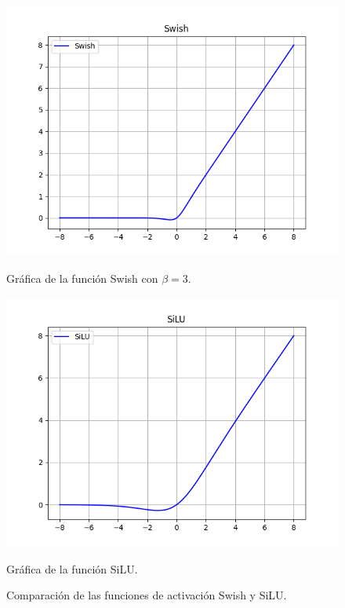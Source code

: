 \begin{figure}[h]
    \centering
    \begin{minipage}[b]{0.45\textwidth}
        \centering
        \includegraphics[width=\textwidth]{img/Swish.png}
        \caption{Gráfica de la función Swish con \(\beta = 3\).}
        \label{fig:swish}
    \end{minipage}
    \hfill
    \begin{minipage}[b]{0.45\textwidth}
        \centering
        \includegraphics[width=\textwidth]{img/SiLU.png}
        \caption{Gráfica de la función SiLU.}
        \label{fig:silu}
    \end{minipage}
    \caption{Comparación de las funciones de activación Swish y SiLU.}
    \label{fig:activf}
\end{figure}



